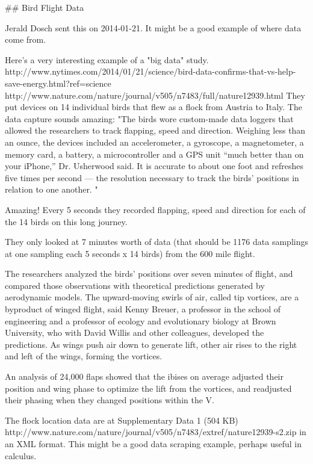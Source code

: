 ## Bird Flight Data

Jerald Dosch sent this on 2014-01-21.  It might be a good example of where data come from.

Here's a very interesting example of a "big data" study.  
http://www.nytimes.com/2014/01/21/science/bird-data-confirms-that-vs-help-save-energy.html?ref=science
http://www.nature.com/nature/journal/v505/n7483/full/nature12939.html
They put devices on 14 individual birds that flew as a flock from Austria to Italy.  The data capture sounds amazing:  "The birds wore custom-made data loggers that allowed the researchers to track flapping, speed and direction. Weighing less than an ounce, the devices included an accelerometer, a gyroscope, a magnetometer, a memory card, a battery, a microcontroller and a GPS unit “much better than on your iPhone,” Dr. Usherwood said. It is accurate to about one foot and refreshes five times per second — the resolution necessary to track the birds’ positions in relation to one another. "

Amazing!  Every 5 seconds they recorded flapping, speed and direction for each of the 14 birds on this long journey.


They only looked at 7 minutes worth of data (that should be 1176 data samplings at one sampling each 5 seconds x 14 birds) from the 600 mile flight.  

The researchers analyzed the birds’ positions over seven minutes of flight, and compared those observations with theoretical predictions generated by aerodynamic models. The upward-moving swirls of air, called tip vortices, are a byproduct of winged flight, said Kenny Breuer, a professor in the school of engineering and a professor of ecology and evolutionary biology at Brown University, who with David Willis and other colleagues, developed the predictions. As wings push air down to generate lift, other air rises to the right and left of the wings, forming the vortices. 

An analysis of 24,000 flaps showed that the ibises on average adjusted their position and wing phase to optimize the lift from the vortices, and readjusted their phasing when they changed positions within the V.

The flock location data are at Supplementary Data 1 (504 KB) http://www.nature.com/nature/journal/v505/n7483/extref/nature12939-s2.zip in an XML format.  This might be a good data scraping example, perhaps useful in calculus.
